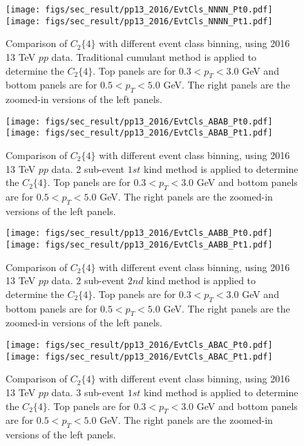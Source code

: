 \begin{figure}[H]
\centering
\texttt{[image: figs/sec\_result/pp13\_2016/EvtCls\_NNNN\_Pt0.pdf]}
\texttt{[image: figs/sec\_result/pp13\_2016/EvtCls\_NNNN\_Pt1.pdf]}
\caption{Comparison of $C_{2}\{4\}$ with different event class binning, using 2016 13 TeV $pp$ data. Traditional cumulant method is applied to determine the $C_{2}\{4\}$. Top panels are for $0.3<p_{T}<3.0$ GeV and bottom panels are for $0.5<p_{T}<5.0$ GeV. The right panels are the zoomed-in versions of the left panels.}
\label{fig:result_pp13_2016_EvtCls_NNNN}
\end{figure}

\begin{figure}[H]
\centering
\texttt{[image: figs/sec\_result/pp13\_2016/EvtCls\_ABAB\_Pt0.pdf]}
\texttt{[image: figs/sec\_result/pp13\_2016/EvtCls\_ABAB\_Pt1.pdf]}
\caption{Comparison of $C_{2}\{4\}$ with different event class binning, using 2016 13 TeV $pp$ data. 2 sub-event $1st$ kind method is applied to determine the $C_{2}\{4\}$. Top panels are for $0.3<p_{T}<3.0$ GeV and bottom panels are for $0.5<p_{T}<5.0$ GeV. The right panels are the zoomed-in versions of the left panels.}
\label{fig:result_pp13_2016_EvtCls_ABAB}
\end{figure}

\begin{figure}[H]
\centering
\texttt{[image: figs/sec\_result/pp13\_2016/EvtCls\_AABB\_Pt0.pdf]}
\texttt{[image: figs/sec\_result/pp13\_2016/EvtCls\_AABB\_Pt1.pdf]}
\caption{Comparison of $C_{2}\{4\}$ with different event class binning, using 2016 13 TeV $pp$ data. 2 sub-event $2nd$ kind method is applied to determine the $C_{2}\{4\}$. Top panels are for $0.3<p_{T}<3.0$ GeV and bottom panels are for $0.5<p_{T}<5.0$ GeV. The right panels are the zoomed-in versions of the left panels.}
\label{fig:result_pp13_2016_EvtCls_AABB}
\end{figure}

\begin{figure}[H]
\centering
\texttt{[image: figs/sec\_result/pp13\_2016/EvtCls\_ABAC\_Pt0.pdf]}
\texttt{[image: figs/sec\_result/pp13\_2016/EvtCls\_ABAC\_Pt1.pdf]}
\caption{Comparison of $C_{2}\{4\}$ with different event class binning, using 2016 13 TeV $pp$ data. 3 sub-event $1st$ kind method is applied to determine the $C_{2}\{4\}$. Top panels are for $0.3<p_{T}<3.0$ GeV and bottom panels are for $0.5<p_{T}<5.0$ GeV. The right panels are the zoomed-in versions of the left panels.}
\label{fig:result_pp13_2016_EvtCls_ABAC}
\end{figure}

